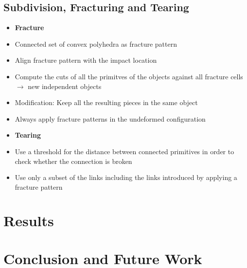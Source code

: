 \documentclass[
	11pt, 
	DIV10,
	a4paper, 
	oneside, 
	headings=normal, 
	captions=tableheading,
	final, 
	numbers=noenddot
]{scrartcl}
\begin{document}
\subsection{Subdivision, Fracturing and Tearing}
	\begin{itemize}
		\item[] \textbf{Fracture}
		\item Connected set of convex polyhedra as fracture pattern
		\item Align fracture pattern with the impact location
		\item Compute the cuts of all the primitves of the objects against all fracture cells $\rightarrow$ new independent objects
		\item Modification: Keep all the resulting pieces in the same object
		\item Always apply fracture patterns in the undeformed configuration
		\item[] \textbf{Tearing}
		\item Use a threshold for the distance between connected primitives in order to check whether the connection is broken
		\item Use only a subset of the links including the links introduced by applying a fracture pattern
	\end{itemize}

\section{Results}

\section{Conclusion and Future Work}




\end{document}
